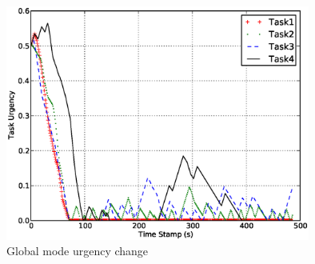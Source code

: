 \documentclass{llncs}
\begin{document}
\begin{figure}
\centering
\includegraphics[width=10cm, angle=0]
{images/global/GlobalPlotUrgencyLog-2010Feb18-151600-clear.eps}
\caption{Global mode urgency change}
\label{fig:1} %
\end{figure}
\end{document}
